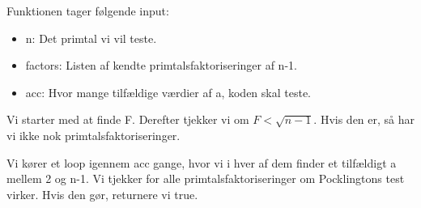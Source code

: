 Funktionen tager følgende input:
\begin{itemize}
	\item n: Det primtal vi vil teste.
	\item factors: Listen af kendte primtalsfaktoriseringer af n-1.
	\item acc: Hvor mange tilfældige værdier af a, koden skal teste.
\end{itemize}

Vi starter med at finde F. Derefter tjekker vi om $F<\sqrt{n-1}$. Hvis
den er, så har vi ikke nok primtalsfaktoriseringer.

Vi kører et loop igennem acc gange, hvor vi i hver af dem finder et
tilfældigt a mellem 2 og n-1. Vi tjekker for alle
primtalsfaktoriseringer om Pocklingtons test virker. Hvis den gør,
returnere vi true.
